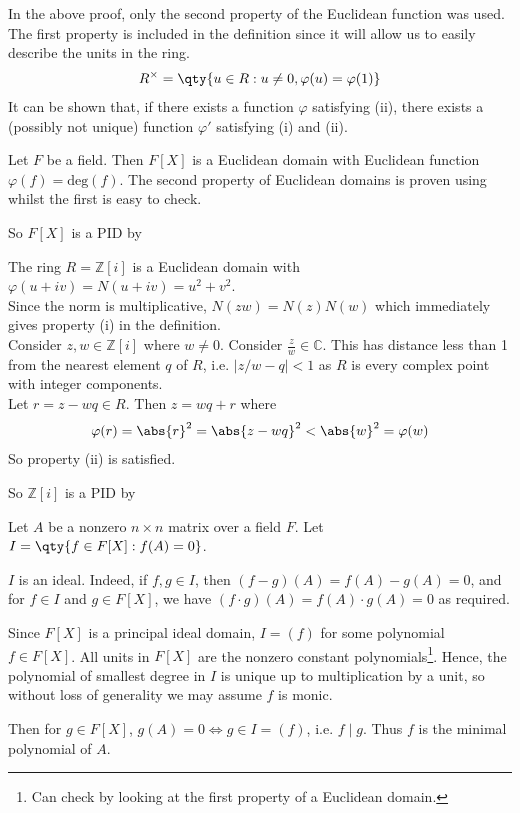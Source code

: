 \begin{remark}
	In the above proof, only the second property of the Euclidean function was used.
	The first property is included in the definition since it will allow us to easily describe the units in the ring.
	\begin{align*}
		R^\times = \qty{u \in R : u \neq 0, \varphi(u) = \varphi(1)}
	\end{align*}
	It can be shown that, if there exists a function $\varphi$ satisfying (ii), there exists a (possibly not unique) function $\varphi'$ satisfying (i) and (ii).
\end{remark}

\begin{example}
	Let $F$ be a field.
	Then $F[X]$ is a Euclidean domain with Euclidean function $\varphi(f) = \mathrm{deg}(f)$.
	The second property of Euclidean domains is proven using  whilst the first is easy to check.

	So $F[X]$ is a PID by 
\end{example}

\begin{example}
	The ring $R = \mathbb Z[i]$ is a Euclidean domain with $\varphi(u+iv) = N(u+iv) = u^2+v^2$. \\
	Since the norm is multiplicative, $N(zw) = N(z)N(w)$ which immediately gives property (i) in the definition. \\
	Consider $z, w \in \mathbb Z[i]$ where $w \neq 0$.
	Consider $\frac{z}{w} \in \mathbb C$.
	This has distance less than 1 from the nearest element $q$ of $R$, i.e. $|z / w - q| < 1$ as $R$ is every complex point with integer components. \\
	Let $r = z - w q \in R$.
	Then $z = w q + r$ where
	\begin{align*}
		\varphi(r) = \abs{r}^2 = \abs{z - w q}^2 < \abs{w}^2 = \varphi(w)
	\end{align*}
	So property (ii) is satisfied.

	So $\mathbb Z[i]$ is a PID by 
\end{example}

\begin{example}
	Let $A$ be a nonzero $n \times n$ matrix over a field $F$.
	Let $I = \qty{f \in F[X] : f(A) = 0}$.

	$I$ is an ideal.
	Indeed, if $f, g \in I$, then $(f-g)(A) = f(A) - g(A) = 0$, and for $f \in I$ and $g \in F[X]$, we have $(f \cdot g)(A) = f(A) \cdot g(A) = 0$ as required.

	Since $F[X]$ is a principal ideal domain, $I = (f)$ for some polynomial $f \in F[X]$.
	All units in $F[X]$ are the nonzero constant polynomials\footnote{Can check by looking at the first property of a Euclidean domain.}.
	Hence, the polynomial of smallest degree in $I$ is unique up to multiplication by a unit, so without loss of generality we may assume $f$ is monic.

	Then for $g \in F[X]$, $g(A) = 0 \iff g \in I = (f)$, i.e. $f \mid g$.
	Thus $f$ is the minimal polynomial of $A$.
\end{example}

